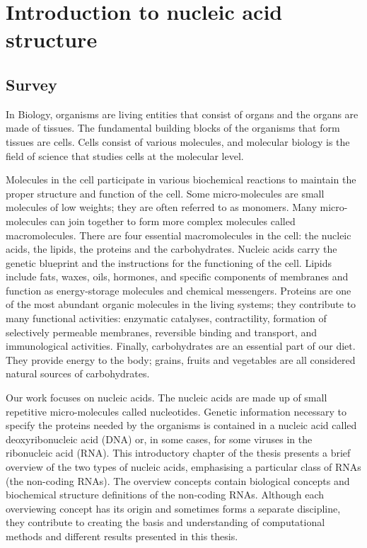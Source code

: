 \chapter{Introduction to nucleic acid structure }\label{ch:introduction}
\section{Survey}
In Biology, organisms are living entities that consist of organs and the organs are made of tissues. The fundamental building blocks of the organisms that form tissues are cells. Cells consist of various molecules, and molecular biology is the field of science that studies cells at the molecular level. 

Molecules in the cell participate in various biochemical reactions to maintain the proper structure and function of the cell. Some micro-molecules are small molecules of low weights; they are often referred to as monomers. Many micro-molecules can join together to form more complex molecules called macromolecules. There are four essential macromolecules in the cell: the nucleic acids, the lipids, the proteins and the carbohydrates. Nucleic acids carry the genetic blueprint and the instructions for the functioning of the cell. Lipids include fats, waxes, oils, hormones, and specific components of membranes and function as energy-storage molecules and chemical messengers. Proteins are one of the most abundant organic molecules in the living systems; they contribute to many functional activities: enzymatic catalyses, contractility, formation of selectively permeable membranes, reversible binding and transport, and immunological activities. Finally, carbohydrates are an essential part of our diet. They provide energy to the body; grains, fruits and vegetables are all considered natural sources of carbohydrates.

Our work focuses on nucleic acids. The nucleic acids are made up of small repetitive micro-molecules called nucleotides. Genetic information necessary to specify the proteins needed by the organisms is contained in a nucleic acid called deoxyribonucleic acid (DNA) or, in some cases, for some viruses in the ribonucleic acid (RNA). This introductory chapter of the thesis presents a brief overview of the two types of nucleic acids, emphasising a particular class of RNAs (the non-coding RNAs). The overview concepts contain biological concepts and biochemical structure definitions of the non-coding RNAs. Although each overviewing concept has its origin and sometimes forms a separate discipline, they contribute to creating the basis and understanding of computational methods and different results presented in this thesis.  

